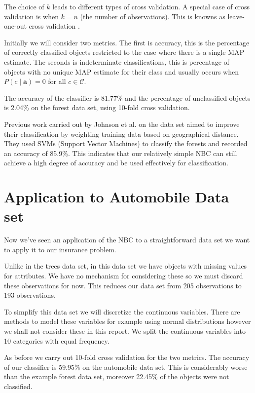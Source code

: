 The choice of $k$ leads to different types of cross validation.
A special case of cross validation is when $k=n$ (the number of observations).
This is knowns as leave-one-out cross validation \cite{Priddy05}.

Initially we will consider two metrics.
The first is accuracy, this is the percentage of correctly classified objects restricted to the case where there is a single MAP estimate.
The seconds is indeterminate classifications, this is percentage of objects with no unique MAP estimate for their class and usually occurs when $P(c \mid \mathbf{a}) = 0$ for all $c \in \mathcal{C}$.

The accuracy of the classifier is 81.77\% and the percentage of unclassified objects is 2.04\% on the forest data set, using 10-fold cross validation.

Previous work carried out by Johnson et al. \cite{Johnson12} on the data set aimed to improve their classification by weighting training data based on geographical distance.
They used SVMs (Support Vector Machines) to classify the forests and recorded an accuracy of 85.9\%.
This indicates that our relatively simple NBC can still achieve a high degree of accuracy and be used effectively for classification.

\section{Application to Automobile Data set}

Now we've seen an application of the NBC to a straightforward data set we want to apply it to our insurance problem.

Unlike in the trees data set, in this data set we have objects with missing values for attributes.
We have no mechanism for considering these so we must discard these observations for now.
This reduces our data set from 205 observations to 193 observations.

To simplify this data set we will discretize the continuous variables.
There are methods to model these variables for example using normal distributions \cite{Dumitru09} however we shall not consider these in this report.
We split the continuous variables into 10 categories with equal frequency.

As before we carry out 10-fold cross validation for the two metrics.
The accuracy of our classifier is 59.95\% on the automobile data set.
This is considerably worse than the example forest data set, moreover 22.45\% of the objects were not classified.

